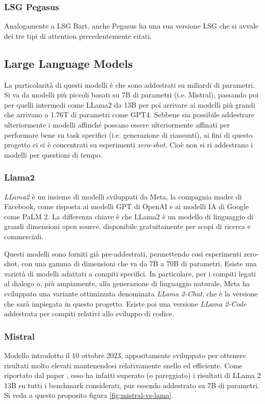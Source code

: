 \documentclass[12pt,a4paper,twoside,openright]{book}
\begin{document}
\subsubsection{LSG Pegasus}
Analogamente a LSG Bart, anche Pegasus ha una sua versione LSG che si avvale dei tre tipi di attention precedentemente citati.


\subsection{Large Language Models}
La particolarità di questi modelli è che sono addestrati su miliardi di parametri. Si va da modelli più piccoli basati su 7B di parametri (i.e. Mistral), passando poi per quelli intermedi come LLama2 da 13B per poi arrivare ai modelli più grandi che arrivano a 1.76T di parametri come GPT4. 
Sebbene sia possibile addestrare ulteriormente i modelli affinché possano essere ulteriormente affinati per performare bene su task specifici (i.e. generazione di riassunti), ai fini di questo progetto ci si è concentrati su esperimenti \emph{zero-shot}. Cioè non si ri addestrano i modelli per questioni di tempo.

\subsubsection{Llama2}
\emph{LLama2} \cite{touvron2023llama} è un insieme di modelli sviluppati da Meta, la compagnia madre di Facebook, come risposta ai modelli GPT di OpenAI e ai modelli IA di Google come PaLM 2. La differenza chiave è che LLama2 è un modello di linguaggio di grandi dimensioni open source, disponibile gratuitamente per scopi di ricerca e commerciali. 

Questi modelli sono forniti già pre-addestrati, permettendo così esperimenti zero-shot, con una gamma di dimensioni che va da 7B a 70B di parametri. Esiste una varietà di modelli adattati a compiti specifici. In particolare, per i compiti legati al dialogo o, più ampiamente, alla generazione di linguaggio naturale, Meta ha sviluppato una variante ottimizzata denominata \emph{LLama 2-Chat}, che è la versione che sarà impiegata in questo progetto. Esiste poi una versione \emph{LLama 2-Code} addestrata per compiti relativi allo sviluppo di codice.

\subsubsection{Mistral}
Modello introdotto il 10 ottobre 2023, appositamente sviluppato per ottenere risultati molto elevati mantenendosi relativamente snello ed efficiente. Come riportato dal paper \cite{jiang2023mistral}, esso ha infatti superato (o pareggiato) i risultati di LLama 2 13B su tutti i benchmark considerati, pur essendo addestrato su 7B di parametri. Si veda a questo proposito figura \ref{fig:mistral-vs-lama}.
\end{document}
